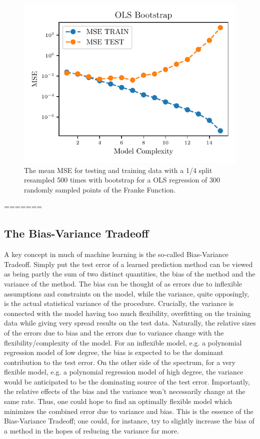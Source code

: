 \documentclass[reprint, english, nofootinbib]{revtex4-2}
\begin{document}
    \begin{figure}[h!tb]
        \center
        \includegraphics[width=\columnwidth]{../figs/OLS_MSE_Bootstrap_Hastie_211.pdf}
        \caption{\label{fig:Hastie2.11 MSE Bootstrap}The mean MSE for testing and training data with a 1/4 split resampled 500 times with bootstrap for a OLS regression of 300 randomly sampled points of the Franke Function.}
    \end{figure}
=======
    \subsection{The Bias-Variance Tradeoff}

	A key concept in much of machine learning is the so-called Bias-Variance Tradeoff. Simply put the test error of a learned prediction method can be viewed as being partly the sum of two distinct quantities, the bias of the method and the variance of the method. The bias can be thought of as errors due to inflexible assumptions and constraints on the model, while the variance, quite opposingly, is the actual statistical variance of the procedure. Crucially, the variance is connected with the model having too much flexibility, overfitting on the training data while giving very spread results on the test data. Naturally, the relative sizes of the errors due to bias and the errors due to variance change with the flexibility/complexity of the model. For an inflexible model, e.g. a polynomial regression model of low degree, the bias is expected to be the dominant contribution to the test error. On the other side of the spectrum, for a very flexible model, e.g. a polynomial regression model of high degree, the variance would be anticipated to be the dominating source of the test error. Importantly, the relative effects of the bias and the variance won't necessarily change at the same rate. Thus, one could hope to find an optimally flexible model which minimizes the combined error due to variance and bias. This is the essence of the Bias-Variance Tradeoff; one could, for instance, try to slightly increase the bias of a method in the hopes of reducing the variance far more.
	
\end{document}
